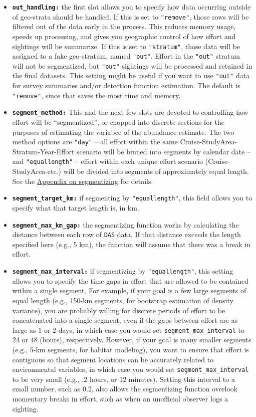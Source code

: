 \documentclass[
]{book}
\begin{document}
\begin{itemize}
\item
  \textbf{\texttt{out\_handling:}} the first slot allows you to specify how data occurring outside of geo-strata should be handled. If this is set to \texttt{"remove"}, those rows will be filtered out of the data early in the process. This reduces memory usage, speeds up processing, and gives you geographic control of how effort and sightings will be summarize. If this is set to \texttt{"stratum"}, those data will be assigned to a fake geo-stratum, named \texttt{"out"}. Effort in the \texttt{"out"} stratum will not be segmentized, but \texttt{"out"} sightings will be processed and retained in the final datasets. This setting might be useful if you want to use \texttt{"out"} data for survey summaries and/or detection function estimation. The default is \texttt{"remove"}, since that saves the most time and memory.
\item
  \textbf{\texttt{segment\_method:}} This and the next few slots are devoted to controlling how effort will be ``segmentized'', or chopped into discrete sections for the purposes of estimating the variabce of the abundance estimate. The two method options are \texttt{"day"} -- all effort within the same Cruise-StudyArea-Stratum-Year-Effort scenario will be binned into segments by calendar date -- and \texttt{"equallength"} -- effort within each unique effort scenario (Cruise-StudyArea-etc.) will be divided into segments of approximately equal length. See the \protect\hyperlink{segmentizing}{Appendix on segmentizing} for details.
\item
  \textbf{\texttt{segment\_target\_km:}} if segmenting by \texttt{"equallength"}, this field allows you to specify what that target length is, in km.
\item
  \textbf{\texttt{segment\_max\_km\_gap:}} the segmentizing function works by calculating the distance between each row of \texttt{DAS} data. If that distance exceeds the length specified here (e.g., 5 km), the function will assume that there was a break in effort.
\item
  \textbf{\texttt{segment\_max\_interval:}} if segmentizing by \texttt{"equallength"}, this setting allows you to specify the time gaps in effort that are allowed to be contained within a single segment. For example, if your goal is a few large segments of equal length (e.g., 150-km segments, for bootstrap estimation of density variance), you are probably willing for discrete periods of effort to be concatenated into a single segment, even if the gaps between effort are as large as 1 or 2 days, in which case you would set \texttt{segment\_max\_interval} to 24 or 48 (hours), respectively. However, if your goal is many smaller segments (e.g., 5-km segments, for habitat modeling), you want to ensure that effort is contiguous so that segment locations can be accurately related to environmental variables, in which case you would set \texttt{segment\_max\_interval} to be very small (e.g., .2 hours, or 12 minutes). Setting this interval to a small number, such as 0.2, also allows the segmentizing function overlook momentary breaks in effort, such as when an unofficial observer logs a sighting.

\end{itemize}
\end{document}
